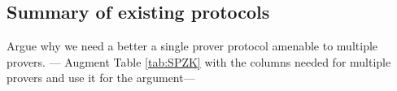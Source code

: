 \subsection{Summary of existing protocols}
Argue why we need a better a single prover protocol amenable to multiple provers. 
--- Augment Table \ref{tab:SPZK} with the columns needed for multiple provers and use it for the argument--- 
\begin{comment}
\begin{center}\label{tab:SPZK}
	\begin{tabular}{|>{\centering}p{1.8cm}|p{2cm}|p{1.8cm}|>{\centering}p{1.3cm}|p{1.8cm}|p{1.2cm}|p{1.2cm}| } 
		\hline
		Protocols & \multicolumn{3}{c|}{Prover's complexity} & Verifier's complexity & Proof size & rounds \\
		\hline
		&computation & communi- cation & MPC rounds& & & \\ 
		\hline
		Ligero & $O(n\log n)M$ & NA & NA &$O(n)M$ & $O(\sqrt{n})$ & 4\\
		\hline
		Bulletproofs & $O(nE+q(n+m)M)$ & $O(2N-1)$ & $O(\log n)$& $O(nE+$ $q(n+m)M)$ & $O(\log n)$ & $O(\log n)$  \\
		\hline
		Spartan & & & & & &\\
		\hline
		Aurora & & & & & &\\
		\hline
		\name2D & $O(n \log n)M$  $+nE)$ & $O(2N-1)$ & 1 &$O((nM +$ $ n^{1-1/c}E))$ & $O(n^{1/c})$ & $O(\log n)$ \\
		\hline
		\name3D & $O(nM+nE)$ & $O(2N-1)$& 1 & $O(nM+$ $n^{1-2/c}E)$ & $O(n^{1/c})$ & $O(\log n) $\\
		\hline
	\end{tabular}
\end{center}
\end{comment}
